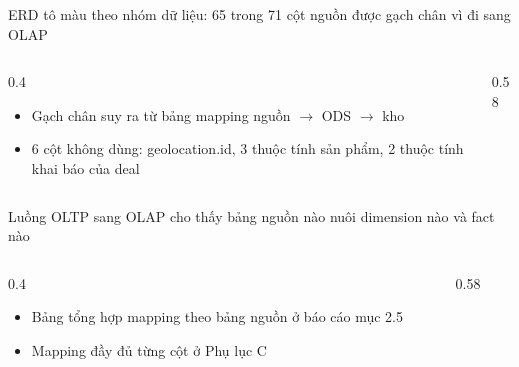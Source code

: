 \begin{frame}{ERD tô màu theo nhóm dữ liệu: 65 trong 71 cột nguồn được gạch chân vì đi sang OLAP}
\begin{columns}[T]\begin{column}{0.4\textwidth}
\begin{itemize}
  \item Gạch chân suy ra từ bảng mapping nguồn $\rightarrow$ ODS $\rightarrow$ kho
  \item 6 cột không dùng: geolocation.id, 3 thuộc tính sản phẩm, 2 thuộc tính khai báo của deal
\end{itemize}
\end{column}\begin{column}{0.58\textwidth}
\begin{center}\end{center}
\end{column}\end{columns}

\end{frame}

\begin{frame}{Luồng OLTP sang OLAP cho thấy bảng nguồn nào nuôi dimension nào và fact nào}
\begin{columns}[T]\begin{column}{0.4\textwidth}
\begin{itemize}
  \item Bảng tổng hợp mapping theo bảng nguồn ở báo cáo mục 2.5
  \item Mapping đầy đủ từng cột ở Phụ lục C
\end{itemize}
\end{column}\begin{column}{0.58\textwidth}
\begin{center}\end{center}
\end{column}\end{columns}

\end{frame}

